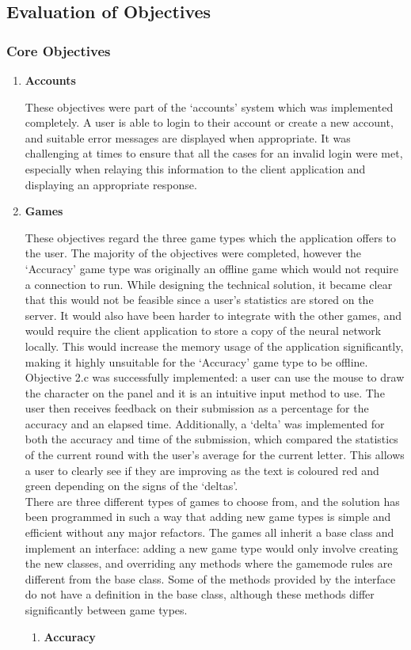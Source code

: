 \documentclass{article}
\begin{document}
\subsection{Evaluation of Objectives}
\subsubsection{Core Objectives}
\begin{enumerate}
    \item \textbf{Accounts}

    These objectives were part of the `accounts' system which was implemented completely. A user is able to login to their account or create a new account, and suitable error messages are displayed when appropriate. It was challenging at times to ensure that all the cases for an invalid login were met, especially when relaying this information to the client application and displaying an appropriate response.

    \item \textbf{Games}

    These objectives regard the three game types which the application offers to the user. The majority of the objectives were completed, however the `Accuracy' game type was originally an offline game which would not require a connection to run. While designing the technical solution, it became clear that this would not be feasible since a user's statistics are stored on the server. It would also have been harder to integrate with the other games, and would require the client application to store a copy of the neural network locally. This would increase the memory usage of the application significantly, making it highly unsuitable for the `Accuracy' game type to be offline. \\
    
    Objective 2.c was successfully implemented: a user can use the mouse to draw the character on the panel and it is an intuitive input method to use. The user then receives feedback on their submission as a percentage for the accuracy and an elapsed time. Additionally, a `delta' was implemented for both the accuracy and time of the submission, which compared the statistics of the current round with the user's average for the current letter. This allows a user to clearly see if they are improving as the text is coloured red and green depending on the signs of the `deltas'. \\
    
    There are three different types of games to choose from, and the solution has been programmed in such a way that adding new game types is simple and efficient without any major refactors. The games all inherit a base class and implement an interface: adding a new game type would only involve creating the new classes, and overriding any methods where the gamemode rules are different from the base class. Some of the methods provided by the interface do not have a definition in the base class, although these methods differ significantly between game types.
    \begin{enumerate}
        \item \textbf{Accuracy}


\end{enumerate}
\end{enumerate}
\end{document}
